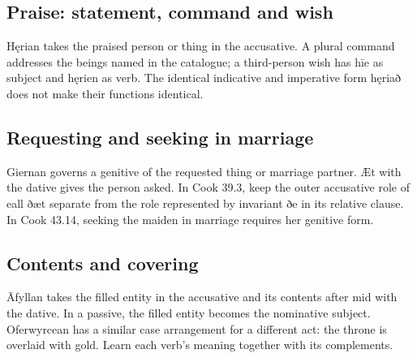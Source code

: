 \subsection*{Praise: statement, command and wish}

Hęrian takes the praised person or thing in the accusative. A plural command addresses the beings named in the catalogue; a third-person wish has hīe as subject and hęrien as verb. The identical indicative and imperative form hęriað does not make their functions identical.

\subsection*{Requesting and seeking in marriage}

Giernan governs a genitive of the requested thing or marriage partner. Æt with the dative gives the person asked. In Cook 39.3, keep the outer accusative role of eall ðæt separate from the role represented by invariant ðe in its relative clause. In Cook 43.14, seeking the maiden in marriage requires her genitive form.

\subsection*{Contents and covering}

Āfyllan takes the filled entity in the accusative and its contents after mid with the dative. In a passive, the filled entity becomes the nominative subject. Oferwyrcean has a similar case arrangement for a different act: the throne is overlaid with gold. Learn each verb’s meaning together with its complements.


